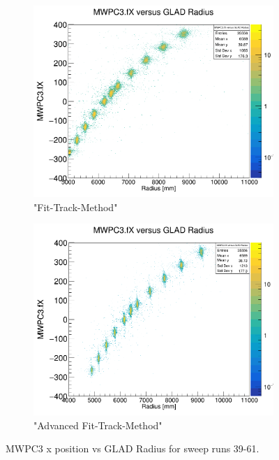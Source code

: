 \documentclass[12pt, letterpaper]{article}
\begin{document}
\begin{figure}[!htbp]
\begin{subfigure}{.5\textwidth}
\end{subfigure}
\begin{subfigure}{.5\textwidth}
  \centering
  \includegraphics[width=.9\linewidth]{plot_imgs/mw3_rho_fit.png} 
  \caption{"Fit-Track-Method"}
  \label{fig:sub-second}
\end{subfigure}
\begin{subfigure}{.5\textwidth}
  \centering
  \includegraphics[width=.9\linewidth]{plot_imgs/mw3_rho_last.png} 
  \caption{"Advanced Fit-Track-Method"}
  \label{fig:sub-second}
\end{subfigure}
\caption{MWPC3 x position vs GLAD Radius for sweep runs 39-61.}
\label{fig:fig}
\end{figure}
\FloatBarrier
\clearpage
\end{document}
